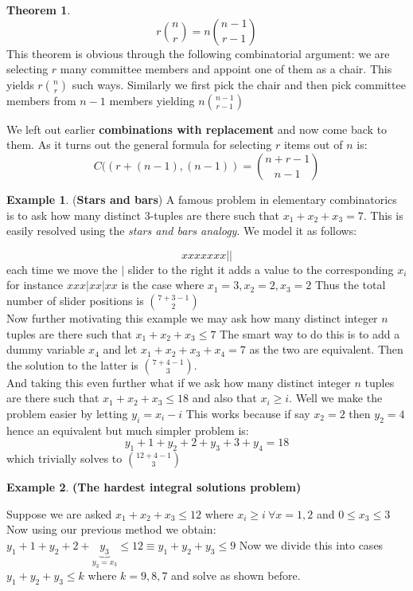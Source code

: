 \documentclass[titlepage]{article}
\theoremstyle{definition}
\newtheorem{theorem}{Theorem}[section]
\newtheorem{example}{Example}
\numberwithin{equation}{subsection}
\numberwithin{remark}{subsection}
\begin{document}
\begin{theorem}
$$ r\binom{n}{r} = n\binom{n-1}{r-1}$$
This theorem is obvious through the following combinatorial argument: we are selecting $r$ many committee members and appoint one of them as a chair. This yields $r\binom{n}{r}$ such ways. Similarly we first pick the chair and then pick committee members from $n-1$ members yielding $n\binom{n-1}{r-1}$
\end{theorem}

We left out earlier \textbf{combinations with replacement} and now come back to them. As it turns out the general formula for selecting $r$ items out of $n$ is:
$$ C((r+(n-1),(n-1)) = \binom{n+r-1}{n-1}$$

\begin{example}(\textbf{Stars and bars})
A famous problem in elementary combinatorics is to ask how many distinct 3-tuples are there such that $x_{1} + x_{2} + x_{3} = 7$. This is easily resolved using the \textit{stars and bars analogy}. We model it as follows:

$$ x x x x x x x ||$$ each time we move the $|$ slider to the right it adds a value to the corresponding $x_{i}$ for instance $x x x | x x | x x $ is the case where $x_{1} = 3, x_{2} = 2, x_{3} = 2$ Thus the total number of slider positions is $\binom{7 + 3 - 1}{2}$
\\

Now further motivating this example we may ask how many distinct integer $n$ tuples are there such that $x_{1} + x_{2} + x_{3} \leq 7$ The smart way to do this is to add a dummy variable $x_{4}$ and let $x_{1} + x_{2} + x_{3} + x_{4} = 7$ as the two are equivalent. Then the solution to the latter is $\binom{7 + 4 - 1}{3}$.
\\

And taking this even further what if we ask how many distinct integer $n$ tuples are there such that $x_{1} + x_{2} + x_{3} \leq 18$ and also that $x_{i} \geq i$. Well we make the problem easier by letting $y_{i} = x_{i} - i$ This works because if say $x_{2} = 2$ then $y_{2} = 4$ hence an equivalent but much simpler problem is:
$$ y_{1} + 1 + y_{2} + 2 + y_{3} + 3 + y_{4} = 18 $$ which trivially solves to $\binom{12 + 4-1}{3}$
\end{example}

\begin{example}\textbf{(The hardest integral solutions problem)}

Suppose we are asked $x_{1} + x_{2} + x_{3} \leq 12$ where $x_{i} \geq i \ \forall x = 1,2$ and $ 0 \leq x_{3} \leq 3$ Now using our previous method we obtain:
$y_{1} + 1 + y_{2} + 2 + \underbrace{y_{3}}_{y_{3}=x_{3}} \leq 12 \equiv y_{1} + y_{2} + y_{3} \leq 9 $ Now we divide this into cases $y_{1} + y_{2} + y_{3} \leq k$ where $k=9,8,7$ and solve as shown before. 
\end{example}
\end{document}
